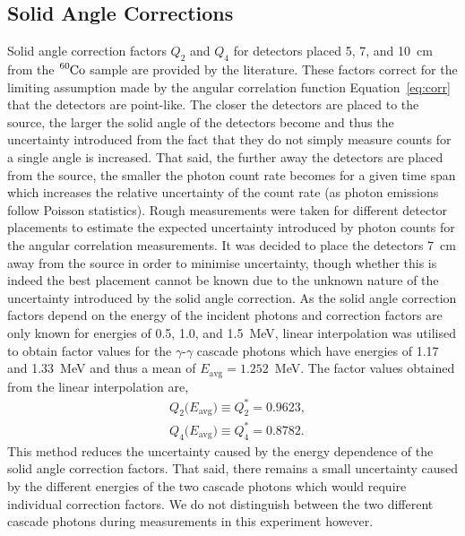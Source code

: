 \documentclass[twocolumn]{article}
\begin{document}
\subsection{Solid Angle Corrections}
Solid angle correction factors $Q_2$ and $Q_4$ for detectors placed 5, 7, and 10~cm from the $\ce{^{60}Co}$ sample are provided by the literature.\cite{sieg} These factors correct for the limiting assumption made by the angular correlation function Equation~\ref{eq:corr} that the detectors are point-like. The closer the detectors are placed to the source, the larger the solid angle of the detectors become and thus the uncertainty introduced from the fact that they do not simply measure counts for a single angle is increased. That said, the further away the detectors are placed from the source, the smaller the photon count rate becomes for a given time span which increases the relative uncertainty of the count rate (as photon emissions follow Poisson statistics). Rough measurements were taken for different detector placements to estimate the expected uncertainty introduced by photon counts for the angular correlation measurements. It was decided to place the detectors 7~cm away from the source in order to minimise uncertainty, though whether this is indeed the best placement cannot be known due to the unknown nature of the uncertainty introduced by the solid angle correction. As the solid angle correction factors depend on the energy of the incident photons and correction factors are only known for energies of 0.5, 1.0, and 1.5~MeV, linear interpolation was utilised to obtain factor values for the $\gamma$-$\gamma$ cascade photons which have energies of 1.17 and 1.33~MeV and thus a mean of $E_{\text{avg}} = 1.252$~MeV. The factor values obtained from the linear interpolation are,
\begin{align*}
&Q_2\big(E_{\text{avg}}\big) \equiv Q^*_2 = 0.9623,\\
&Q_4\big(E_{\text{avg}}\big) \equiv Q^*_4 = 0.8782.
\end{align*}
This method reduces the uncertainty caused by the energy dependence of the solid angle correction factors. That said, there remains a small uncertainty caused by the different energies of the two cascade photons which would require individual correction factors. We do not distinguish between the two different cascade photons during measurements in this experiment however.
\end{document}
